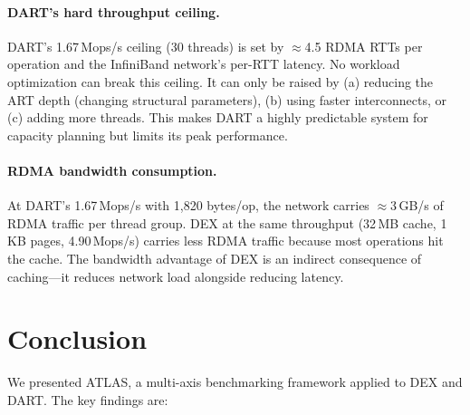 \documentclass[sigconf, nonacm]{acmart}
\begin{document}
\paragraph{DART's hard throughput ceiling.}
DART's 1.67\,Mops/s ceiling (30 threads) is set by ${\approx}$4.5 RDMA RTTs per operation and the InfiniBand network's per-RTT latency. No workload optimization can break this ceiling. It can only be raised by (a) reducing the ART depth (changing structural parameters), (b) using faster interconnects, or (c) adding more threads. This makes DART a highly predictable system for capacity planning but limits its peak performance.

\paragraph{RDMA bandwidth consumption.}
At DART's 1.67\,Mops/s with 1,820 bytes/op, the network carries ${\approx}$3\,GB/s of RDMA traffic per thread group. DEX at the same throughput (32\,MB cache, 1\,KB pages, 4.90\,Mops/s) carries less RDMA traffic because most operations hit the cache. The bandwidth advantage of DEX is an indirect consequence of caching---it reduces network load alongside reducing latency.

\section{Conclusion}
\label{sec:conclusion}

We presented ATLAS, a multi-axis benchmarking framework applied to DEX and DART. The key findings are:
\end{document}
